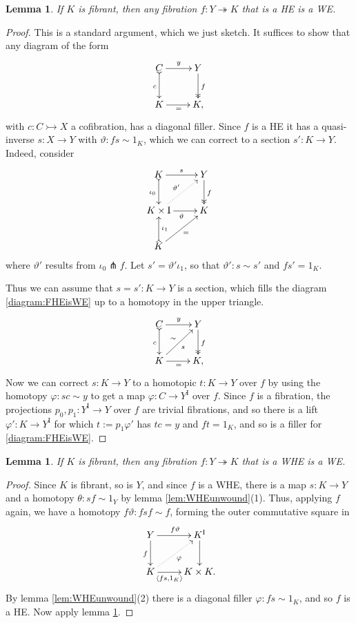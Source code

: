 \documentclass[12pt]{article}
\newcommand{\mono}{\ensuremath{\rightarrowtail}}
\newcommand{\ra}{\ensuremath{\rightarrow}}
\newcommand{\onto}{\ensuremath{\twoheadrightarrow}}
\newcommand{\I}{\ensuremath{\mathrm{I}}}
\newtheorem{lemma}[theorem]{Lemma}
\theoremstyle{remark}
\theoremstyle{definition}
\begin{document}
\begin{lemma}\label{FibHETFib}
If $K$ is fibrant, then any fibration $f : Y \onto K$ that is a HE is a WE.
\end{lemma}
\begin{proof}
This is a standard argument, which we just sketch.  It suffices to show that any diagram of the form
\begin{equation}\label{diagram:FHEisWE}
\xymatrix{
C \ar@{>->}[d]_{c} \ar[r]^y & Y \ar@{>>}[d]^{f} \\
K\ar[r]_{=} & K,
}
\end{equation}
with  $c : C \mono X$  a cofibration, has a diagonal filler.  
Since $f$ is a HE it has a quasi-inverse $s:X\ra Y$ with $\vartheta : fs\sim 1_K$, which we can correct to a section $s' : K\ra Y$. 
Indeed, consider 
\begin{equation*}%
\xymatrix{
K \ar@{>->}[d]_{\iota_0} \ar[r]^{s}  & Y\ar@{>>}[d]^{f} \\
K\times \I \ar[r]_{\vartheta} \ar@{..>}[ru]^{\vartheta'}& K\\
K \ar@{>->}[u]_{\iota_1} \ar[ru]_=&
}
\end{equation*}
where $\vartheta' $ results from $\iota_0 \pitchfork f$. Let $s' = \vartheta' \iota_1$, so that $\vartheta' : s\sim s'$ and $fs' = 1_K$.

Thus we can assume that $s = s' : K\ra Y$ is a section, which fills the diagram \eqref{diagram:FHEisWE} up to a homotopy in the upper triangle.
\begin{equation*}%
\xymatrix{
C \ar@{>->}[d]_{c} \ar[r]^y & Y \ar@{>>}[d]^{f} \\
K\ar[r]_{=} \ar[ru]_{s}^{\sim} & K,
}
\end{equation*}
Now we can correct $s: K\ra Y$ to a homotopic $t : K\ra Y$ over $f$ by using the homotopy $\varphi : sc\sim y$  to get a map $\varphi : C\ra Y^\I$ over $f$.  Since $f$ is a fibration, the projections $p_0, p_1:Y^\I \ra Y$ over $f$ are trivial fibrations, and so there is a lift $\varphi': K\ra Y^\I$ for which $t:= p_1\varphi'$ has $tc= y$ and $ft=1_K$, and so is a filler for \eqref{diagram:FHEisWE}.
\end{proof}

\begin{lemma}\label{FibWHEfibCodTFib}
If $K$ is fibrant, then any fibration $f : Y \onto K$ that is a WHE is a WE.
\end{lemma}
\begin{proof}
Since $K$ is fibrant, so is $Y$, and since $f$ is a WHE, there is a map $s : K\ra Y$ and a homotopy $\theta: sf \sim 1_Y$ by lemma \ref{lem:WHEunwound}(1).  Thus, applying $f$ again, we have a homotopy $f\vartheta: fsf \sim f$, forming the outer commutative square in
\[
\xymatrix{
Y \ar[d]_{f} \ar[r]^{f\vartheta}  & K^\I \ar[d] \\
K \ar@{..>}[ru]_{\varphi} \ar[r]_-{\langle fs, 1_K\rangle} & K\times K.
}
\]
By lemma \ref{lem:WHEunwound}(2) there is a diagonal filler $\varphi : fs\sim 1_K$, and so $f$ is a HE. Now apply lemma \ref{FibHETFib}.
\end{proof}
\end{document}
